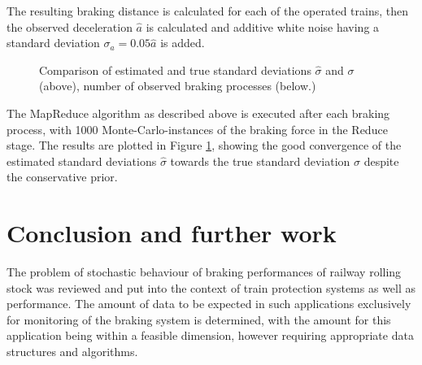 \documentclass[a4paper, 12pt]{scrartcl}
\begin{document}
The resulting braking distance is calculated for each of the operated trains, then the observed deceleration $\hat{a}$ is calculated and additive white noise having a standard deviation $\sigma_{a} = 0.05 \hat{a}$ is added. 

\begin{figure}
\begin{center}
\caption{Comparison of estimated and true standard deviations $\hat{\sigma}$  and $\sigma$ (above), number of observed braking processes (below.)}
\label{Fig:BrakingSD}
\end{center}
\end{figure}

The MapReduce algorithm as described above is executed after each braking process, with 1000 Monte-Carlo-instances of the braking force in the Reduce stage. The results are plotted in Figure \ref{Fig:BrakingSD}, showing the good convergence of the estimated standard deviations $\hat{\sigma}$ towards the true standard deviation $\sigma$ despite the conservative prior.

\section{Conclusion and further work}
The problem of stochastic behaviour of braking performances of railway rolling stock was reviewed and put into the context of train protection systems as well as performance. The amount of data to be expected in such applications exclusively for monitoring of the braking system is determined, with the amount for this application being within a feasible dimension, however requiring appropriate data structures and algorithms.
\end{document}
